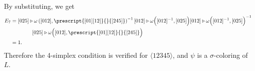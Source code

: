 \documentclass[a4paper, oneside]{amsart}
\numberwithin{equation}{subsection}
\theoremstyle{referencedlemma}
\theoremstyle{plain} %
\theoremstyle{remark}
\begin{document}
By substituting, we get
\begin{align*}
E_7 &= 
 [025]\triangleright \omega\left([012], \prescript{[01][12]}{}{[245]} \right)^{-1} [012] \triangleright  \omega \Big ([012]^{-1}, [025]\Big )
  [012]\triangleright  \omega \Big ( [012]^{-1}, [025]\Big )^{-1}\\
& \quad \quad \quad \quad [025]\triangleright \omega\Big ( [012], \prescript{[01][12]}{}{[245]}\Big )\\
& = 1.
\end{align*}
Therefore the 4-simplex condition is verified for $\langle 12345\rangle$, and $\psi$ is a $\sigma$-coloring of $L$. 



\newpage



\end{document}
